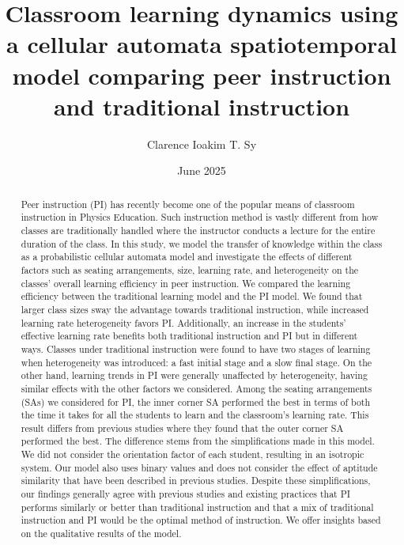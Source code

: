 \documentclass[twocolumn,secnumarabic,amssymb, nobibnotes, aps, prd]{revtex4-2}
\begin{document}
\title{Classroom learning dynamics using a cellular automata spatiotemporal model comparing peer instruction and traditional instruction}%

\author{Clarence Ioakim T. Sy}%
%
\date{June 2025}%

\begin{abstract}
    Peer instruction (PI) has recently become one of the popular means of classroom instruction in Physics Education. 
    Such instruction method is vastly different from how classes are traditionally handled where the instructor conducts a lecture for the entire duration of the class.
    In this study, we model the transfer of knowledge within the class as a probabilistic cellular automata model and investigate the effects of different factors such as seating arrangements, size, learning rate, and heterogeneity on the classes' overall learning efficiency in peer instruction.
    We compared the learning efficiency between the traditional learning model and the PI model. 
    We found that larger class sizes sway the advantage towards traditional instruction, while increased learning rate heterogeneity favors PI.
    Additionally, an increase in the students' effective learning rate benefits both traditional instruction and PI but in different ways.
    Classes under traditional instruction were found to have two stages of learning when heterogeneity was introduced: a fast initial stage and a slow final stage.
    On the other hand, learning trends in PI were generally unaffected by heterogeneity, having similar effects with the other factors we considered.
    Among the seating arrangements (SAs) we considered for PI, the inner corner SA performed the best in terms of both the time it takes for all the students to learn and the classroom’s learning rate.
    This result differs from previous studies where they found that the outer corner SA performed the best.
    The difference stems from the simplifications made in this model.
    We did not consider the orientation factor of each student, resulting in an isotropic system.
    Our model also uses binary values and does not consider the effect of aptitude similarity that have been described in previous studies. 
    Despite these simplifications, our findings generally agree with previous studies and existing practices that PI performs similarly or better than traditional instruction and that a mix of traditional instruction and PI would be the optimal method of instruction.
    We offer insights based on the qualitative results of the model.
\end{abstract}
\end{document}
